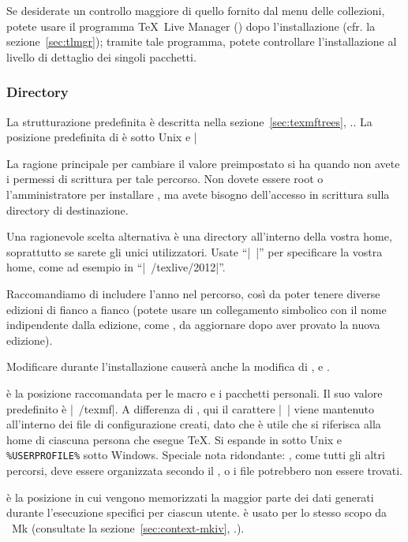 \documentclass{article}
\begin{document}
Se desiderate un controllo maggiore di quello fornito dal menu delle
collezioni, potete usare il programma \TeX\ Live Manager ()
dopo l'installazione (cfr. la sezione~\ref{sec:tlmgr}); tramite tale
programma, potete controllare l'installazione al livello di dettaglio dei
singoli pacchetti.

\subsubsection{Directory}
\label{sec:directories}

La strutturazione predefinita è descritta nella
sezione~\ref{sec:texmftrees}, \p.\pageref{sec:texmftrees}. La posizione
predefinita di  è  sotto
Unix e |%

La ragione principale per cambiare il valore preimpostato si ha quando non
avete i permessi di scrittura per tale percorso. Non dovete essere root o
l'amministratore per installare \TL, ma avete bisogno dell'accesso in
scrittura sulla directory di destinazione.

Una ragionevole scelta alternativa è una directory all'interno della
vostra home, soprattutto se sarete gli unici utilizzatori. Usate ``|~|''
per specificare la vostra home, come ad esempio in ``|~/texlive/2012|''.

Raccomandiamo di includere l'anno nel percorso, così da poter tenere
diverse edizioni di \TL{} fianco a fianco (potete usare un collegamento
simbolico con il nome indipendente dalla edizione, come
, da aggiornare dopo aver provato la nuova
edizione).

Modificare  durante l'installazione causerà anche la
modifica di ,  e
.

 è la posizione raccomandata per le macro e i pacchetti
personali. Il suo valore predefinito è |~/texmf|. A differenza di
, qui il carattere |~| viene mantenuto all'interno dei
file di configurazione creati, dato che è utile che si riferisca alla home
di ciascuna persona che esegue \TeX. Si espande in  sotto
Unix e \verb|%USERPROFILE%| sotto Windows. Speciale nota ridondante:
, come tutti gli altri percorsi, deve essere organizzata
secondo il \TDS, o i file potrebbero non essere trovati. %

 è la posizione in cui vengono memorizzati la maggior
parte dei dati generati durante l'esecuzione specifici per ciascun utente.
 è usato per lo stesso scopo da \ConTeXt\ Mk
(consultate la sezione~\ref{sec:context-mkiv},
\p.\pageref{sec:context-mkiv}).
\end{document}
